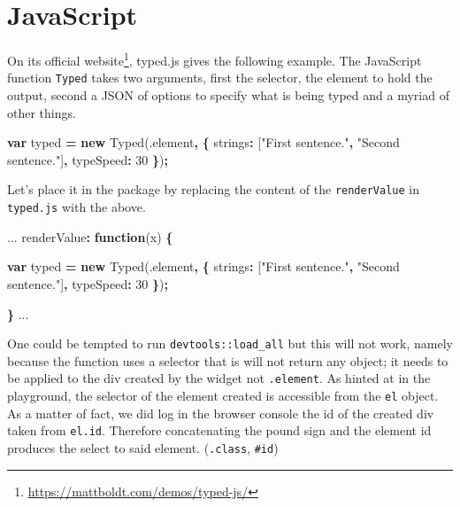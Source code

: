 \documentclass[
]{krantz}
\makeatletter
\newenvironment{Shaded}{\begin{snugshade}}{\end{snugshade}}
\newcommand{\AttributeTok}[1]{\textcolor[rgb]{0.61,0.61,0.61}{#1}}
\newcommand{\DataTypeTok}[1]{\textcolor[rgb]{0.27,0.27,0.27}{#1}}
\newcommand{\DecValTok}[1]{\textcolor[rgb]{0.06,0.06,0.06}{#1}}
\newcommand{\KeywordTok}[1]{\textcolor[rgb]{0.27,0.27,0.27}{\textbf{#1}}}
\newcommand{\NormalTok}[1]{#1}
\newcommand{\OperatorTok}[1]{\textcolor[rgb]{0.43,0.43,0.43}{\textbf{#1}}}
\newcommand{\StringTok}[1]{\textcolor[rgb]{0.5,0.5,0.5}{#1}}
\renewcommand{\href}[2]{#2\footnote{\url{#1}}}
\newenvironment{kframe}{%
\medskip{}
\setlength{\fboxsep}{.8em}
 \def\at@end@of@kframe{}%
 \ifinner\ifhmode%
  \def\at@end@of@kframe{\end{minipage}}%
  \begin{minipage}{\columnwidth}%
 \fi\fi%
 \def\FrameCommand##1{\hskip\@totalleftmargin \hskip-\fboxsep
 \colorbox{shadecolor}{##1}\hskip-\fboxsep
     \hskip-\linewidth \hskip-\@totalleftmargin \hskip\columnwidth}%
 \MakeFramed {\advance\hsize-\width
   \@totalleftmargin\z@ \linewidth\hsize
   \@setminipage}}%
 {\par\unskip\endMakeFramed%
 \at@end@of@kframe}
\renewenvironment{Shaded}{\begin{kframe}}{\end{kframe}}
\makeatother
\begin{document}
\hypertarget{javascript-1}{%
\section*{JavaScript}\label{javascript-1}}


On its \href{https://mattboldt.com/demos/typed-js/}{official website}, typed.js gives the following example. The JavaScript function \texttt{Typed} takes two arguments, first the selector, the element to hold the output, second a JSON of options to specify what is being typed and a myriad of other things.

\begin{Shaded}
\begin{Highlighting}[]
\KeywordTok{var}\NormalTok{ typed }\OperatorTok{=} \KeywordTok{new} \AttributeTok{Typed}\NormalTok{(}\StringTok{\textquotesingle{}.element\textquotesingle{}}\OperatorTok{,} \OperatorTok{\{}
  \DataTypeTok{strings}\OperatorTok{:}\NormalTok{ [}\StringTok{"First sentence."}\OperatorTok{,} \StringTok{"Second sentence."}\NormalTok{]}\OperatorTok{,}
  \DataTypeTok{typeSpeed}\OperatorTok{:} \DecValTok{30}
\OperatorTok{\}}\NormalTok{)}\OperatorTok{;}
\end{Highlighting}
\end{Shaded}

Let's place it in the package by replacing the content of the \texttt{renderValue} in \texttt{typed.js} with the above.

\begin{Shaded}
\begin{Highlighting}[]
\NormalTok{...}
\NormalTok{renderValue}\OperatorTok{:} \KeywordTok{function}\NormalTok{(x) }\OperatorTok{\{}

  \KeywordTok{var}\NormalTok{ typed }\OperatorTok{=} \KeywordTok{new} \AttributeTok{Typed}\NormalTok{(}\StringTok{\textquotesingle{}.element\textquotesingle{}}\OperatorTok{,} \OperatorTok{\{}
    \DataTypeTok{strings}\OperatorTok{:}\NormalTok{ [}\StringTok{"First sentence."}\OperatorTok{,} \StringTok{"Second sentence."}\NormalTok{]}\OperatorTok{,}
    \DataTypeTok{typeSpeed}\OperatorTok{:} \DecValTok{30}
  \OperatorTok{\}}\NormalTok{)}\OperatorTok{;}

\OperatorTok{\}}
\NormalTok{...}
\end{Highlighting}
\end{Shaded}

One could be tempted to run \texttt{devtools::load\_all} but this will not work, namely because the function uses a selector that is will not return any object; it needs to be applied to the div created by the widget not \texttt{.element}. As hinted at in the playground, the selector of the element created is accessible from the \texttt{el} object. As a matter of fact, we did log in the browser console the id of the created div taken from \texttt{el.id}. Therefore concatenating the pound sign and the element id produces the select to said element. (\texttt{.class}, \texttt{\#id})
\end{document}
